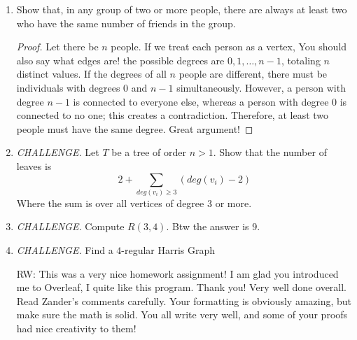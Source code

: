 \begin{enumerate}[leftmargin=*]
\begin{proof}
The necessary and sufficient condition for $K_{a,b,c}$ to be an Eulerian graph is that the degree of every vertex must be even. For the degree of each vertex to be even, $a+b$, $b+c$, and $c+a$ must each be even. \color{red} Sure; can you make it any simpler? \color{black}
\end{proof}
\item Show that, in any group of two or more people, there are always at least two who have the same number of friends in the group. 
\begin{proof}
Let there be $n$ people. If we treat each person as a vertex, \color{red} You should also say what edges are! \color{black} the possible degrees are $0, 1, \dots, n-1$, totaling $n$ distinct values. If the degrees of all $n$ people are different, there must be individuals with degrees $0$ and $n-1$ simultaneously. However, a person with degree $n-1$ is connected to everyone else, whereas a person with degree $0$ is connected to no one; this creates a contradiction. Therefore, at least two people must have the same degree. \color{red} Great argument! \color{black}
\end{proof}
\item \textit{CHALLENGE. } Let $T$ be a tree of order $n > 1$. Show that the number of leaves is 
$$ 2 + \sum_{deg(v_i) \geq 3}{(deg(v_i)-2)}$$
Where the sum is over all vertices of degree $3$ or more. 

\item \textit{CHALLENGE. } Compute $R(3,4)$. Btw the answer is 9. 
\item \textit{CHALLENGE. } Find a $4$-regular Harris Graph 



\color{blue} RW: This was a very nice homework assignment! I am glad you introduced me to Overleaf, I quite like this program. Thank you!  \color{black}
\color{green} Very well done overall. Read Zander's comments carefully. Your formatting is obviously amazing, but make sure the math is solid. You all write very well, and some of your proofs had nice creativity to them!\color{black}
\end{enumerate}



